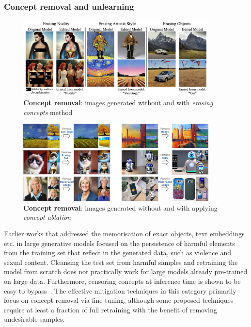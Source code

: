 \documentclass[conference]{IEEEtran}
\begin{document}
\subsubsection{Concept removal and unlearning}\label{sec:mitigation-concept}
\begin{figure}[ht]
    \centering
    \includegraphics[width=0.9\textwidth]{figures/erasing-concepts.png}
    \caption{\textbf{Concept removal}: images generated without and with \textit{erasing concepts} method~\cite{gandikota_erasing_2023}}
    \label{fig:erasing-concepts}
\end{figure}
\begin{figure}[ht]
    \centering
    \includegraphics[width=0.9\textwidth]{figures/ablating-concepts.jpg}
    \caption{\textbf{Concept removal}: images generated without and with applying \textit{concept ablation}~\cite{kumari_ablating_2023}}
    \label{fig:ablation}
\end{figure}
Earlier works that addressed the memorisation of exact objects, text embeddings etc. in large generative models focused on the persistence of harmful elements from the training set that reflect in the generated data, such as violence and sexual content. 
Cleansing the test set from harmful samples and retraining the model from scratch does not practically work for large models already pre-trained on large data. Furthermore, censoring concepts at inference time is shown to be easy to bypass~\cite{rando_red-teaming_2022}.
The effective mitigation techniques in this category primarily focus on concept removal via fine-tuning, although some proposed techniques require at least a fraction of full retraining with the benefit of removing undesirable samples. 
\end{document}
